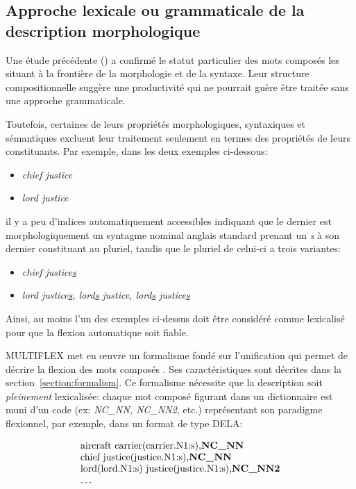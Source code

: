\subsection{Approche lexicale ou grammaticale de la description morphologique}
Une étude précédente (\cite{these-Savary}) a confirmé le statut particulier des mots composés
les situant à la frontière de la morphologie et de la syntaxe. Leur structure compositionnelle
suggère une productivité qui ne pourrait guère être traitée sans une approche grammaticale. 

Toutefois, certaines de leurs propriétés morphologiques, syntaxiques et sémantiques excluent leur
traitement seulement en termes des propriétés de leurs constituants. Par exemple, dans les deux
exemples ci-dessous:

\begin{itemize}
\item \emph{chief justice}
\item \emph{lord justice}
\end{itemize} 

\noindent il y a peu d'indices automatiquement accessibles indiquant que le dernier est
morphologiquement un syntagme nominal anglais standard prenant un \emph{s} à son dernier constituant
au pluriel, tandis que le pluriel de celui-ci a trois variantes:
 
\begin{itemize}
\item \emph{chief justice\underline{s}}
\item \emph{lord justice\underline{s}, lord\underline{s} justice,
lord\underline{s} justice\underline{s}}
\end{itemize}
 
\bigskip
\noindent Ainsi, au moins l'un des exemples ci-dessus doit être considéré comme lexicalisé pour que
la flexion automatique soit fiable.

\bigskip
\noindent MULTIFLEX met en {\oe}uvre un formalisme fondé sur l'unification qui permet de décrire la
flexion des mots composés \cite{Savary05}. Ses caractéristiques sont décrites dans la
section~\ref{section:formalism}. Ce formalisme nécessite que la description soit \emph{pleinement}
lexicalisée: chaque mot composé figurant dans un dictionnaire est muni d'un code (ex: \emph{NC\_NN,
NC\_NN2}, etc.) représentant son paradigme flexionnel, par exemple, dans un format de type DELA:

\[
\begin{array}[c]{l}
  $aircraft carrier(carrier.N1:s),\textbf{NC\_NN}$ \\
  $chief justice(justice.N1:s),\textbf{NC\_NN}$ \\
  $lord(lord.N1:s) justice(justice.N1:s),\textbf{NC\_NN2}$ \\
  \dots
\end{array}
\]

